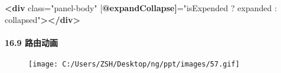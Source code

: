 \documentclass[
]{article}
\newenvironment{Shaded}{}{}
\newcommand{\ErrorTok}[1]{\textcolor[rgb]{1.00,0.00,0.00}{\textbf{#1}}}
\newcommand{\KeywordTok}[1]{\textcolor[rgb]{0.00,0.44,0.13}{\textbf{#1}}}
\newcommand{\OtherTok}[1]{\textcolor[rgb]{0.00,0.44,0.13}{#1}}
\newcommand{\StringTok}[1]{\textcolor[rgb]{0.25,0.44,0.63}{#1}}
\begin{document}
\begin{enumerate}
\begin{Shaded}
\begin{Highlighting}[]
\KeywordTok{\textless{}div}\OtherTok{ class=}\StringTok{"panel{-}body"}\OtherTok{ [}\ErrorTok{@expandCollapse]}\OtherTok{=}\StringTok{"isExpended ? \textquotesingle{}expanded\textquotesingle{} : \textquotesingle{}collapsed\textquotesingle{}"}\KeywordTok{\textgreater{}\textless{}/div\textgreater{}}
\end{Highlighting}
\end{Shaded}
\end{enumerate}

\hypertarget{169-ux8defux7531ux52a8ux753b}{%
\paragraph{16.9 路由动画}\label{169-ux8defux7531ux52a8ux753b}}

\begin{figure}
\centering
\texttt{[image: C:/Users/ZSH/Desktop/ng/ppt/images/57.gif]}
\caption{}
\end{figure}
\end{document}
